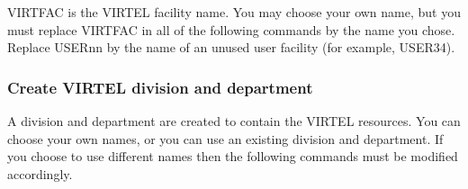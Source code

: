 \documentclass[letterpaper,10pt,english]{sphinxmanual}
\begin{document}
\begin{sphinxVerbatim}[commandchars=\\\{\}]
  
  
  
  
  
  
\end{sphinxVerbatim}


VIRTFAC is the VIRTEL facility name. You may choose your own name, but you must replace VIRTFAC in all of the following commands by the name you chose. Replace USERnn by the name of an unused user facility (for example, USER34).


\subsubsection{Create VIRTEL division and department}
\label{\detokenize{Installation_Guide:create-virtel-division-and-department}}
\begin{sphinxVerbatim}[commandchars=\\\{\}]
   
    
\end{sphinxVerbatim}


A division and department are created to contain the VIRTEL resources. You can choose your own names, or you can use an existing division and department. If you choose to use different names then the following commands must be modified accordingly.
\end{document}
